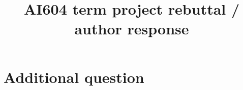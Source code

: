 \documentclass[rebuttal]{cvpr}
\newcommand{\todoc}[2]{{\textcolor{#1} {\textbf{[#2]}}}}
\newcommand{\todored}[1]{\todoc{red}{\textbf{#1}}}
\newcommand{\TA}[1]{\todored{TA: #1}}
\begin{document}
\title{AI604 term project rebuttal / author response}  %

\maketitle
\thispagestyle{empty}











\section{Additional question}
\end{document}
